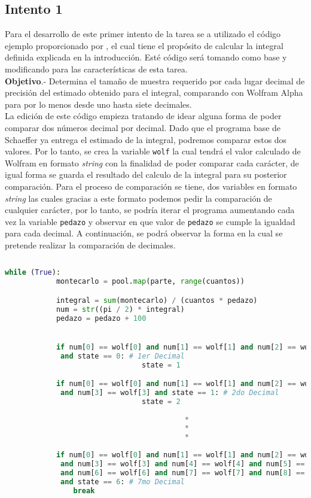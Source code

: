 \documentclass{article}
\begin{document}
	\subsection{Intento 1}
 Para el desarrollo de este primer intento de la  tarea se a utilizado el código ejemplo proporcionado por \citet{DRA.Code} , el cual tiene el propósito de calcular la integral definida explicada en la introducción. Esté código será  tomando como base y modificando para las características de esta tarea.\\ 
 
 \textbf{Objetivo}.- Determina el tamaño de muestra requerido por cada lugar decimal de precisión del estimado obtenido para el integral, comparando con Wolfram Alpha para por lo menos desde uno hasta siete decimales.\\
 
 La edición de este código empieza tratando de idear alguna forma de poder comparar dos números decimal por decimal. Dado que el programa base de Schaeffer ya entrega el estimado de la integral, podremos comparar  estos dos valores. Por lo tanto, se crea la variable \texttt{wolf} la cual tendrá el valor calculado de Wolfram en formato \textit{string} con la finalidad de poder comparar cada carácter, de igual forma se guarda el resultado del calculo de la integral para su posterior comparación. Para el proceso de comparación se tiene, dos variables en formato \textit{string} las cuales gracias a este formato podemos pedir la comparación de cualquier carácter, por lo tanto, se podría iterar el programa aumentando cada vez la variable \texttt{pedazo} y observar en que valor de \texttt{pedazo} se cumple la igualdad para cada decimal. A continuación, se podrá observar la forma en la cual se pretende realizar la comparación de decimales.
 
 \begin{lstlisting}[language=Python]
        
while (True):
            montecarlo = pool.map(parte, range(cuantos))

            integral = sum(montecarlo) / (cuantos * pedazo)
            num = str((pi / 2) * integral)
            pedazo = pedazo + 100


            if num[0] == wolf[0] and num[1] == wolf[1] and num[2] == wolf[2]
             and state == 0: # 1er Decimal
                                state = 1

            if num[0] == wolf[0] and num[1] == wolf[1] and num[2] == wolf[2]
             and num[3] == wolf[3] and state == 1: # 2do Decimal
                                state = 2
                                
                                          *
                                          *
                                          *
                                          
            if num[0] == wolf[0] and num[1] == wolf[1] and num[2] == wolf[2]
             and num[3] == wolf[3] and num[4] == wolf[4] and num[5] == wolf[5]
             and num[6] == wolf[6] and num[7] == wolf[7] and num[8] == wolf[8] 
             and state == 6: # 7mo Decimal
                break            
 \end{lstlisting}
 
\end{document}

